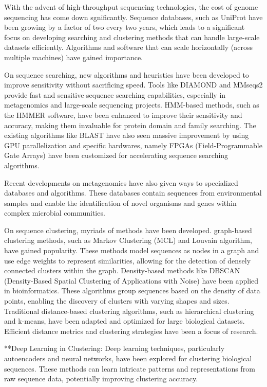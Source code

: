 With the advent of high-throughput sequencing technologies, the cost of genome sequencing has come down sgnificantly. Sequence databases, such as UniProt have been growing by a factor of two every two years, which leads to a significant focus on developing searching and clustering methods that can handle large-scale datasets efficiently. Algorithms and software that can scale horizontally (across multiple machines) have gained importance.

On sequence searching, new algorithms and heuristics have been developed to improve sensitivity without sacrificing speed. Tools like DIAMOND and MMseqs2 provide fast and sensitive sequence searching capabilities, especially in metagenomics and large-scale sequencing projects. HMM-based methods, such as the HMMER software, have been enhanced to improve their sensitivity and accuracy, making them invaluable for protein domain and family searching. The existing algorithms like BLAST have also seen massive improvement by using GPU parallelization and specific hardwares, namely FPGAs (Field-Programmable Gate Arrays) have been customized for accelerating sequence searching algorithms.

Recent developments on metagenomics have also given ways to specialized databases and algorithms. These databases contain sequences from environmental samples and enable the identification of novel organisms and genes within complex microbial communities.

On sequence clustering, myriads of methods have been developed. graph-based clustering methods, such as Markov Clustering (MCL) and Louvain algorithm, have gained popularity. These methods model sequences as nodes in a graph and use edge weights to represent similarities, allowing for the detection of densely connected clusters within the graph. Density-based methods like DBSCAN (Density-Based Spatial Clustering of Applications with Noise) have been applied in bioinformatics. These algorithms group sequences based on the density of data points, enabling the discovery of clusters with varying shapes and sizes. Traditional distance-based clustering algorithms, such as hierarchical clustering and k-means, have been adapted and optimized for large biological datasets. Efficient distance metrics and clustering strategies have been a focus of research.

**Deep Learning in Clustering: Deep learning techniques, particularly autoencoders and neural networks, have been explored for clustering biological sequences. These methods can learn intricate patterns and representations from raw sequence data, potentially improving clustering accuracy.

